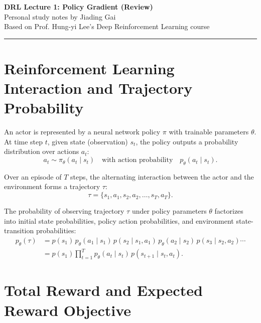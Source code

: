 \documentclass[11pt, a4paper]{article}
\begin{document}
\begin{center}
    {\LARGE \textbf{\textcolor{accent}{DRL Lecture 1: Policy Gradient (Review)}}}\\[6pt]
    {\large Personal study notes by Jiading Gai}\\[4pt]
    {\small \textcolor{muted}{Based on Prof. Hung-yi Lee's Deep Reinforcement Learning course}}
\end{center}

\vspace{6pt}
\hrule
\vspace{12pt}

\section{Reinforcement Learning Interaction and Trajectory Probability}

An actor is represented by a neural network policy $\pi$ with trainable parameters $\theta$. At time step $t$, given state (observation) $s_t$, the policy outputs a probability distribution over actions $a_t$:
\begin{equation}\label{eq:pg-policy}
    a_t \sim \pi_\theta(a_t \mid s_t) \quad \text{with action probability} \quad p_\theta(a_t \mid s_t).
\end{equation}

Over an episode of $T$ steps, the alternating interaction between the actor and the environment forms a trajectory $\tau$:
\begin{equation}\label{eq:pg-trajectory}
    \tau = \{s_1, a_1, s_2, a_2, \dots, s_T, a_T\}.
\end{equation}

The probability of observing trajectory $\tau$ under policy parameters $\theta$ factorizes into initial state probabilities, policy action probabilities, and environment state-transition probabilities:
\begin{align}
    p_\theta(\tau) &= p(s_1)\, p_\theta(a_1 \mid s_1)\, p(s_2 \mid s_1, a_1)\, p_\theta(a_2 \mid s_2)\, p(s_3 \mid s_2, a_2) \cdots \nonumber \\
    &= p(s_1) \prod_{t=1}^{T} p_\theta(a_t \mid s_t)\, p(s_{t+1} \mid s_t, a_t).\label{eq:pg-trajectory-probability}
\end{align}

\section{Total Reward and Expected Reward Objective}
\end{document}
